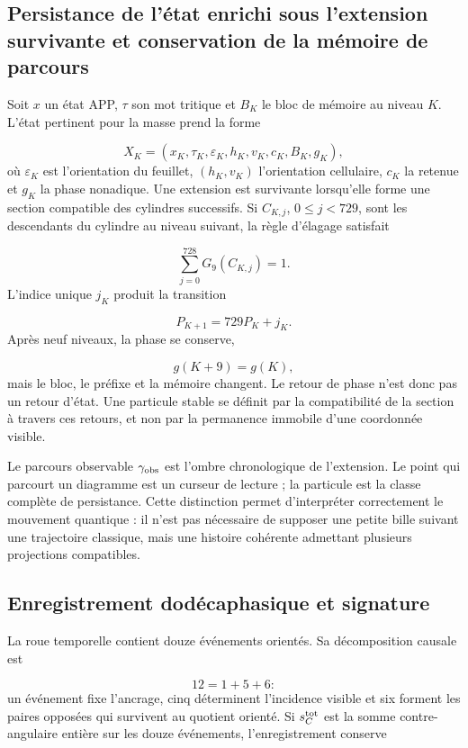 \subsection{Persistance de l'état enrichi sous l'extension survivante et conservation de la mémoire de parcours}
Soit \(x\) un état APP, \(\tau\) son mot tritique et \(B_K\) le bloc de mémoire au niveau \(K\). L'état pertinent pour la masse prend la forme

\[
X_K=(x_K,\tau_K,\varepsilon_K,h_K,v_K,c_K,B_K,g_K),
\]
où \(\varepsilon_K\) est l'orientation du feuillet, \((h_K,v_K)\) l'orientation cellulaire, \(c_K\) la retenue et \(g_K\) la phase nonadique. Une extension est survivante lorsqu'elle forme une section compatible des cylindres successifs. Si \(C_{K,j}\), \(0\le j<729\), sont les descendants du cylindre au niveau suivant, la règle d'élagage satisfait

\[
\sum_{j=0}^{728}G_9(C_{K,j})=1.
\]
L'indice unique \(j_K\) produit la transition

\[
P_{K+1}=729P_K+j_K.
\]
Après neuf niveaux, la phase se conserve,

\[
g(K+9)=g(K),
\]
mais le bloc, le préfixe et la mémoire changent. Le retour de phase n'est donc pas un retour d'état. Une particule stable se définit par la compatibilité de la section à travers ces retours, et non par la permanence immobile d'une coordonnée visible.

Le parcours observable \(\gamma_{\rm obs}\) est l'ombre chronologique de l'extension. Le point qui parcourt un diagramme est un curseur de lecture ; la particule est la classe complète de persistance. Cette distinction permet d'interpréter correctement le mouvement quantique : il n'est pas nécessaire de supposer une petite bille suivant une trajectoire classique, mais une histoire cohérente admettant plusieurs projections compatibles.

\subsection{Enregistrement dodécaphasique et signature}
La roue temporelle contient douze événements orientés. Sa décomposition causale est

\[
12=1+5+6:
\]
un événement fixe l'ancrage, cinq déterminent l'incidence visible et six forment les paires opposées qui survivent au quotient orienté. Si \(s_C^{\rm tot}\) est la somme contre-angulaire entière sur les douze événements, l'enregistrement conserve

